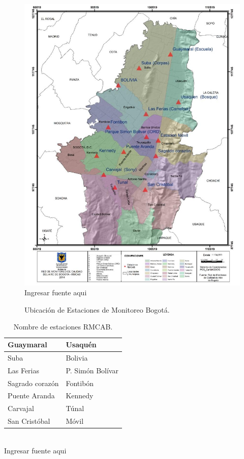 \documentclass[a4paper,openright,12pt]{book}
\theoremstyle{definition}
\theoremstyle{remark}
\begin{document}
\begin{figure}[htb]
\centering
\caption{Ubicación de Estaciones de Monitoreo Bogotá.} 
\includegraphics[scale=0.31]{Ubicacion_RMCAB}
\\Ingresar fuente aqui
\label{fig:Ubicacion}
\end{figure}

\begin{table}[htb]
\centering
\caption{Nombre de estaciones RMCAB.}
\resizebox{5cm}{!} {
\begin{tabular}{|l|l|}
\hline
Guaymaral & Usaquén \\ \hline
Suba & Bolivia \\ \hline
Las Ferias & P. Simón Bolívar \\ \hline
Sagrado corazón & Fontibón \\ \hline
Puente Aranda & Kennedy \\ \hline
Carvajal & Túnal \\ \hline
San Cristóbal & Móvil \\ \hline
\end{tabular}
}
\\Ingresar fuente aqui
\label{tabla:RMCAB1}
\end{table}
\end{document}
